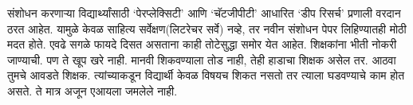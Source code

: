 संशोधन करणाऱ्या विद्यार्थ्यांसाठी `पेरप्लेक्सिटी' आणि `चॅटजीपीटी' आधारित `डीप रिसर्च' प्रणाली वरदान ठरत आहेत. यामुळे केवळ साहित्य सर्वेक्षण(लिटरेचर सर्वे) नव्हे, तर नवीन संशोधन पेपर लिहिण्यातही मोठी मदत होते. एवढे सगळे फायदे दिसत असताना काही तोटेसुद्धा समोर येत आहेत. शिक्षकांना भीती नोकरी जाण्याची. पण ते खूप खरे नाही. मानवी शिकवण्याला तोड नाही, तेही हाडाचा शिक्षक असेल तर. आठवा तुमचे आवडते शिक्षक. त्यांच्याकडून विद्यार्थी केवळ विषयच शिकत नसतो तर त्याला घडवण्याचे काम होत असते. ते मात्र अजून एआयला जमलेले नाही.